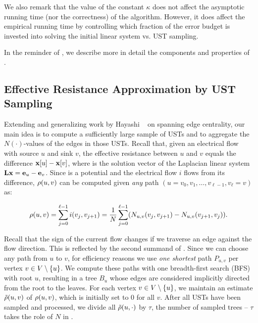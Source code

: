 We also remark that the value of the constant $\kappa$ does not affect the
asymptotic running time (nor the correctness) of the algorithm.
However, it does affect the empirical running time by controlling which fraction
of the error budget is invested into solving the initial linear system vs. UST sampling.

In the reminder of , we describe more in detail the
components and properties of .

\subsection{Effective Resistance Approximation by UST Sampling}
\label{sec:el-clos:eff-res-ust}
Extending and generalizing work by Hayashi \etal~\cite{DBLP:conf/ijcai/HayashiAY16} on spanning
edge centrality, our main idea is to compute a sufficiently large sample of USTs and to aggregate
the $N(\cdot)$-values of the edges in those USTs.
Recall that, given an electrical flow with source $u$ and sink $v$, the effective resistance
between $u$ and $v$ equals the difference $\mathbf{x}[u] - \mathbf{x}[v]$, where  is the solution
vector of the Laplacian linear system $\mathbf{L}\mathbf{x} = \mathbf{e}_{u} - \mathbf{e}_{v}$. Since 
is a potential and the electrical flow $i$ flows from its difference, $\rho(u, v)$ can be computed
given \emph{any} path $(u = v_0, v_1, \ldots, v_{\ell - 1}, v_{\ell} = v)$ as:

\begin{equation}
\label{eq:el-clos:eff-res-path}
\rdist(u, v) = \sum_{j = 0}^{\ell - 1}i(v_j, v_{j + 1}) =
\frac{1}{N}\sum_{j = 0}^{\ell - 1}\roundb{N_{u, v}(v_j, v_{j + 1}) - N_{u, v}(v_{j + 1}, v_j)}.
\end{equation}

Recall that the sign of the current flow changes if we traverse an edge against the flow direction.
This is reflected by the second summand of . Since we can choose any path
from $u$ to $v$, for efficiency reasons we use \emph{one shortest} path $P_{u, v}$ per vertex
$v \in V\setminus\set{u}$.
We compute these paths with one breadth-first search (BFS) with root $u$, resulting in a
tree $B_u$ whose edges are considered implicitly directed from the root to the leaves.
For each vertex $v \in V \setminus\set{u}$, we maintain an estimate $\tilde{\rho}(u, v)$ of
$\rho(u, v)$, which is initially set to 0 for all $v$. After all USTs have
been sampled and processed, we divide all $\tilde{\rho}(u, \cdot)$ by $\tau$, the number of sampled
trees -- \ie $\tau$ takes the role of $N$ in .

